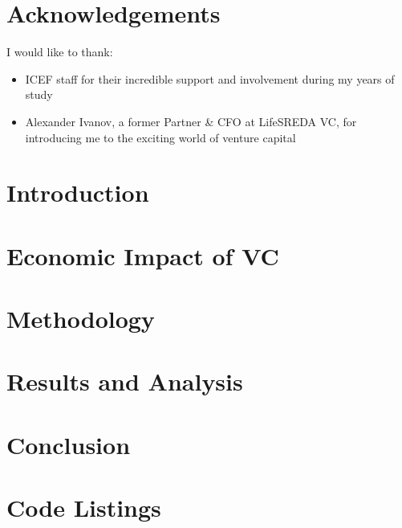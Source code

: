 \documentclass[12pt,twoside]{report}
\title{\title}
\author{\auth}
\date{June 2016}
\begin{document}

\tableofcontents   %



\chapter*{Acknowledgements}
    I would like to thank:
    \begin{itemize}
        \item ICEF staff for their incredible support and involvement during my years of study
        \item Alexander Ivanov, a former Partner \& CFO at LifeSREDA VC, for introducing me to the exciting world of venture capital
    \end{itemize}

\chapter{Introduction}
    

\chapter{Economic Impact of VC}
    

\chapter{Methodology}
    

\chapter{Results and Analysis}
    

\chapter{Conclusion}
    

\appendix %
    \chapter{Code Listings}
    


\printbibliography
\end{document}
